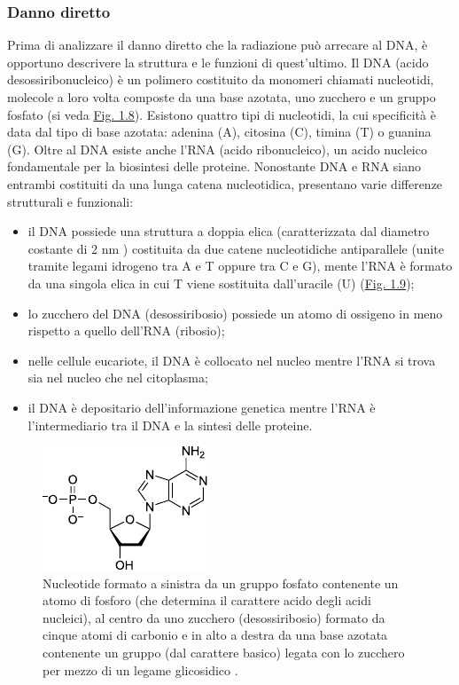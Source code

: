 \documentclass[12pt,a4paper,twoside]{report}
\begin{document}
	\subsubsection{Danno diretto}\label{par:danno_diretto}
	Prima di analizzare il danno diretto che la radiazione può arrecare al DNA, è opportuno descrivere la struttura e le funzioni di quest'ultimo. Il DNA (acido desossiribonucleico) è un polimero costituito da monomeri chiamati nucleotidi, molecole a loro volta composte da una base azotata, uno zucchero e un gruppo fosfato (si veda \hyperref[fig:nucleotide]{Fig. 1.8}). Esistono quattro tipi di nucleotidi, la cui specificità è data dal tipo di base azotata: adenina (A), citosina (C), timina (T) o guanina (G). Oltre al DNA esiste anche l'RNA (acido ribonucleico), un acido nucleico fondamentale per la biosintesi delle proteine. Nonostante DNA e RNA siano entrambi costituiti da una lunga catena nucleotidica, presentano varie differenze strutturali e funzionali:
	\begin{itemize}
		\item il DNA possiede una struttura a doppia elica (caratterizzata dal diametro costante di $2\mbox{ nm}$ \cite{campbell3anno}) costituita da due catene nucleotidiche antiparallele (unite tramite legami idrogeno tra A e T oppure tra C e G), mente l'RNA è formato da una singola elica in cui T viene sostituita dall'uracile (U) (\hyperref[fig:dna_structure]{Fig. 1.9});
		\item lo zucchero del DNA (desossiribosio) possiede un atomo di ossigeno in meno rispetto a quello dell'RNA (ribosio);
		\item nelle cellule eucariote, il DNA è collocato nel nucleo mentre l'RNA si trova sia nel nucleo che nel citoplasma;
		\item il DNA è depositario dell'informazione genetica mentre l'RNA è l'intermediario tra il DNA e la sintesi delle proteine.
	\end{itemize}
	\begin{figure}[H]
		\centering
		\includegraphics[width=0.5\linewidth]{nucleotide.pdf}
		\caption{Nucleotide formato a sinistra da un gruppo fosfato contenente un atomo di fosforo  (che determina il carattere acido degli acidi nucleici), al centro da uno zucchero (desossiribosio) formato da cinque atomi di carbonio e in alto a destra da una base azotata contenente un gruppo  (dal carattere basico) legata con lo zucchero per mezzo di un legame glicosidico \cite{nucleotidi_wiki}.}
		\label{fig:nucleotide}
	\end{figure}
\end{document}
